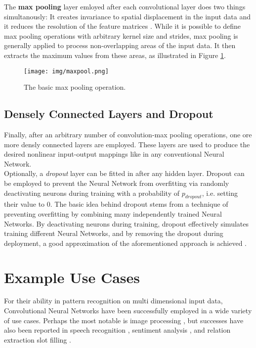 \documentclass[11pt,a4paper,twoside,openright]{scrbook}
\begin{document}
\begin{flushleft}The \textbf{max pooling} layer emloyed after each convolutional layer does two things simultanously:
It creates invariance to spatial displacement in the input data and it reduces the resolution of the feature matrices \cite{Scherer10}. While it is possible to define max pooling operations with arbitrary kernel size and strides, max pooling is generally applied to process non-overlapping areas of the input data. It then extracts the maximum values from these areas, as illustrated in Figure \ref{fig:maxpool}.\end{flushleft}

\begin{figure}[h]
  \centering
  \texttt{[image: img/maxpool.png]}
  \caption{The basic max pooling operation. \cite{url:towardsdatascience:basiccnn}}
  \label{fig:maxpool}
\end{figure}

\subsection{Densely Connected Layers and Dropout}
Finally, after an arbitrary number of convolution-max pooling operations, one ore more densly connected layers are employed. These layers are used to produce the desired nonlinear input-output mappings like in any conventional Neural Network. \\

Optionally, a \emph{dropout} \cite{Srivastava14} layer can be fitted in after any hidden layer. Dropout can be employed to prevent the Neural Network from overfitting via randomly deactivating neurons during training with a probability of \(p_{dropout}\), i.e. setting their value to \(0\). The basic idea behind dropout stems from a technique of preventing overfitting by combining many independently trained Neural Networks. By deactivating neurons during training, dropout effectively simulates training different Neural Networks, and by removing the dropout during deployment, a good approximation of the aforementioned approach is achieved \cite[p.\,1]{Srivastava14}.

\section{Example Use Cases}
For their ability in pattern recognition on multi dimensional input data, Convolutional Neural Networks have been successfully employed in a wide variety of use cases. Perhaps the most notable is image processing \cite{Nowlan95,Bengio94,Donahue15}, but successes have also been reported in
speech recognition \cite{Abel-Hamid14}, sentiment analysis \cite{dosSantos14}, and relation extraction slot filling \cite{Adel16}.
\end{document}
